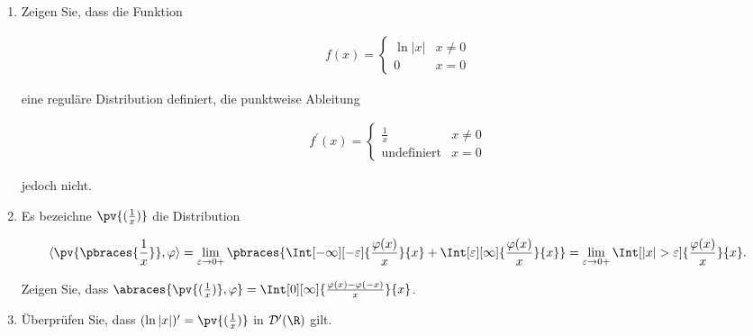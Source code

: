 
\begin{exercise}

\phantom{}

\begin{enumerate}[label = (\roman*)]
    \item Zeigen Sie, dass die Funktion
    
    \begin{align*}
        f(x)
        =
        \begin{cases}
            \ln{|x|} & x \neq 0 \\
            0        & x = 0
        \end{cases}
    \end{align*}

    eine reguläre Distribution definiert, die punktweise Ableitung

    \begin{align*}
        f^\prime(x)
        =
        \begin{cases}
            \frac{1}{x}        & x \neq 0 \\
            \text{undefiniert} & x = 0
        \end{cases}
    \end{align*}

    jedoch nicht.

    \item Es bezeichne $\pv{(\frac{1}{x})}$ die Distribution
    
    \begin{align*}
        \langle \pv{\pbraces{\frac{1}{x}}}, \varphi \rangle
        =
        \lim_{\varepsilon \to 0+}
        \pbraces
        {
            \Int[-\infty][-\varepsilon]
            {
                \frac{\varphi(x)}{x}
            }{x}
            +
            \Int[\varepsilon][\infty]
            {
                \frac{\varphi(x)}{x}
            }{x}
        }
        =
        \lim_{\varepsilon \to 0+}
        \Int[|x| > \varepsilon]
        {
            \frac{\varphi(x)}{x}
        }{x}.
    \end{align*}

    Zeigen Sie, dass $\abraces{\pv{(\frac{1}{x})}, \varphi} = \Int[0][\infty]{\frac{\varphi(x) - \varphi(-x)}{x}}{x}$.

    \item Überprüfen Sie, dass $(\ln{|x|})^\prime = \pv{(\frac{1}{x})}$ in $\mathcal{D}^\prime(\R)$ gilt.

\end{enumerate}

\end{exercise}

